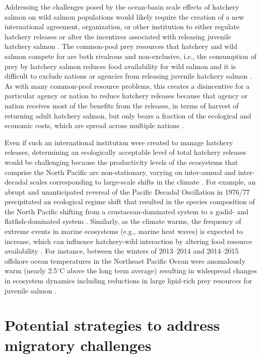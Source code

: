 Addressing the challenges posed by the ocean-basin scale effects of hatchery
salmon on wild salmon populations would likely require the creation of a new
international agreement, organization, or other institution to either regulate
hatchery releases or alter the incentives associated with releasing juvenile
hatchery salmon \citep{Holt2008b}. The common-pool prey resources that hatchery
and wild salmon compete for are both rivalrous and non-exclusive, i.e., the
consumption of prey by hatchery salmon reduces food availability for wild salmon
and it is difficult to exclude nations or agencies from releasing juvenile
hatchery salmon \citep{Hardin1968a}. As with many common-pool resource problems,
this creates a disincentive for a particular agency or nation to reduce hatchery
releases because that agency or nation receives most of the benefits from the
releases, in terms of harvest of returning adult hatchery salmon, but only bears
a fraction of the ecological and economic costs, which are spread across
multiple nations \citep{Holt2008b}.

Even if such an international institution were created to manage hatchery
releases, determining an ecologically acceptable level of total hatchery
releases would be challenging because the productivity levels of the ecosystems
that comprise the North Pacific are non-stationary, varying on inter-annual and
inter-decadal scales corresponding to large-scale shifts in the climate
\citep{Hare1999a, Chavez2003a}. For example, an abrupt and unanticipated
reversal of the Pacific Decadal Oscillation in 1976/77 precipitated an
ecological regime shift that resulted in the species composition of the North
Pacific shifting from a crustacean-dominated system to a gadid- and
flatfish-dominated system \citep{Mantua1997a, Anderson1999a, Mueter2000a}.
Similarly, as the climate warms, the frequency of extreme events in marine
ecosystems (e.g., marine heat waves) is expected to increase, which can
influence hatchery-wild interaction by altering food resource availability
\citep{Jentsch2007, DiLorenzo2016}. For instance, between the winters of
2013--2014 and 2014--2015 offshore ocean temperatures in the Northeast Pacific
Ocean were anomalously warm (nearly 2.5$^{\circ}$C above the long term average)
resulting in widespread changes in ecosystem dynamics including reductions in
large lipid-rich prey resources for juvenile salmon \citep{Bond2015,
DiLorenzo2016}.



\section{Potential strategies to address migratory challenges}

